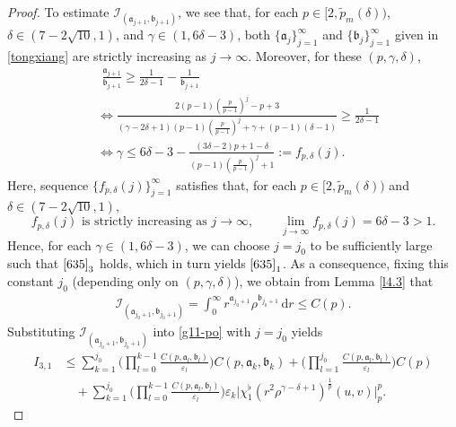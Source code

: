 \documentclass[11pt,reqno]{amsart}
\numberwithin{rk}{section}
\numberwithin{prop}{section}
\numberwithin{mydef}{section}
\numberwithin{lem}{section}
\numberwithin{equation}{section}
\numberwithin{thm}{section}
\begin{document}
\begin{proof}
To estimate $\mathcal{I}_{(\mathfrak{a}_{j+1},\mathfrak{b}_{j+1})}$, we see that, for each $p\in [2,\tilde{p}_m(\delta))$, $\delta\in (7-2\sqrt{10},1)$, and $\gamma\in (1,6\delta-3)$, 
both $\{\mathfrak{a}_j\}_{j=1}^\infty$ and $\{\mathfrak{b}_j\}_{j=1}^\infty$ given in \eqref{tongxiang} are strictly increasing  as $j\to\infty$. 
Moreover, for these $(p,\gamma,\delta)$, 
\begin{equation}\label{635}
\begin{aligned}
&\ \, \frac{\mathfrak{a}_{j+1}}{\mathfrak{b}_{j+1}}\geq \frac{1}{2\delta-1}-\frac{1}{\mathfrak{b}_{j+1}}\\
&\iff  \frac{2(p-1)(\frac{p}{p-1})^{j}-p+3}{(\gamma-2\delta+1)(p-1)(\frac{p}{p-1})^{j}+\gamma+(p-1)(\delta-1)}\geq \frac{1}{2\delta-1}\\
&\iff \gamma\leq 6\delta-3-\frac{(3\delta-2)p+1-\delta}{(p-1)(\frac{p}{p-1})^{j}+1}:=f_{p,\delta}(j).    
\end{aligned}
\end{equation}
Here, sequence $\{f_{p,\delta}(j)\}_{j=1}^\infty$ satisfies that, for each $p\in [2,\tilde{p}_m(\delta))$ and $\delta\in (7-2\sqrt{10},1)$,
\begin{equation*}
f_{p,\delta}(j) \text{ is strictly increasing as $j\to\infty$},\qquad\lim_{j\to\infty}f_{p,\delta}(j)=6\delta-3>1.   
\end{equation*}
Hence, for each $\gamma\in (1,6\delta-3)$, we can choose $j=j_0$ to be sufficiently large such that $\eqref{635}_3$ holds, 
which in turn yields $\eqref{635}_1$. 
As a consequence, fixing this constant $j_0$ (depending only on $(p,\gamma,\delta)$), 
we obtain from Lemma \ref{l4.3} that
\begin{align*}
\mathcal{I}_{(\mathfrak{a}_{j_0+1},\mathfrak{b}_{j_0+1})}=\int_0^\infty r^{\mathfrak{a}_{j_0+1}}\rho^{\mathfrak{b}_{j_0+1}}\,\mathrm{d}r \leq C(p).
\end{align*}
Substituting $\mathcal{I}_{(\mathfrak{a}_{j_0+1},\mathfrak{b}_{j_0+1})}$ into \eqref{g11-po} with $j=j_0$ yields
\begin{equation}\label{g11-po'}
\begin{aligned}
I_{3,1}&\leq \sum_{k=1}^{j_0}\Big(\prod_{l=0}^{k-1}\frac{C(p,\mathfrak{a}_l,\mathfrak{b}_l)}{\varepsilon_{l}}\Big)C(p,\mathfrak{a}_k,\mathfrak{b}_k)
+\Big(\prod_{l=1}^{j_0} \frac{C(p,\mathfrak{a}_l,\mathfrak{b}_l)}{\varepsilon_l}\Big)C(p)\\
&\quad + \sum_{k=1}^{j_0}\Big(\prod_{l=0}^{k-1}\frac{C(p,\mathfrak{a}_l,\mathfrak{b}_l)}{\varepsilon_l}\Big) \varepsilon_{k} \big|\chi_1^\flat(r^2\rho^{\gamma-\delta+1})^\frac{1}{p}(u,v)\big|_{p}^{p}.    
\end{aligned}    
\end{equation}



\end{proof}
\end{document}
